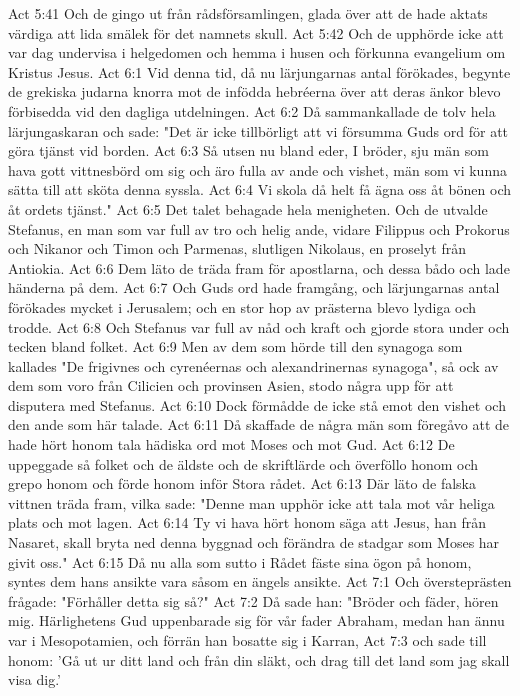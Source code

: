 Act 5:41  Och de gingo ut från rådsförsamlingen, glada över att de hade aktats värdiga att lida smälek för det namnets skull.
Act 5:42  Och de upphörde icke att var dag undervisa i helgedomen och hemma i husen och förkunna evangelium om Kristus Jesus.
Act 6:1  Vid denna tid, då nu lärjungarnas antal förökades, begynte de grekiska judarna knorra mot de infödda hebréerna över att deras änkor blevo förbisedda vid den dagliga utdelningen.
Act 6:2  Då sammankallade de tolv hela lärjungaskaran och sade: "Det är icke tillbörligt att vi försumma Guds ord för att göra tjänst vid borden.
Act 6:3  Så utsen nu bland eder, I bröder, sju män som hava gott vittnesbörd om sig och äro fulla av ande och vishet, män som vi kunna sätta till att sköta denna syssla.
Act 6:4  Vi skola då helt få ägna oss åt bönen och åt ordets tjänst."
Act 6:5  Det talet behagade hela menigheten. Och de utvalde Stefanus, en man som var full av tro och helig ande, vidare Filippus och Prokorus och Nikanor och Timon och Parmenas, slutligen Nikolaus, en proselyt från Antiokia.
Act 6:6  Dem läto de träda fram för apostlarna, och dessa bådo och lade händerna på dem.
Act 6:7  Och Guds ord hade framgång, och lärjungarnas antal förökades mycket i Jerusalem; och en stor hop av prästerna blevo lydiga och trodde.
Act 6:8  Och Stefanus var full av nåd och kraft och gjorde stora under och tecken bland folket.
Act 6:9  Men av dem som hörde till den synagoga som kallades "De frigivnes och cyrenéernas och alexandrinernas synagoga", så ock av dem som voro från Cilicien och provinsen Asien, stodo några upp för att disputera med Stefanus.
Act 6:10  Dock förmådde de icke stå emot den vishet och den ande som här talade.
Act 6:11  Då skaffade de några män som föregåvo att de hade hört honom tala hädiska ord mot Moses och mot Gud.
Act 6:12  De uppeggade så folket och de äldste och de skriftlärde och överföllo honom och grepo honom och förde honom inför Stora rådet.
Act 6:13  Där läto de falska vittnen träda fram, vilka sade: "Denne man upphör icke att tala mot vår heliga plats och mot lagen.
Act 6:14  Ty vi hava hört honom säga att Jesus, han från Nasaret, skall bryta ned denna byggnad och förändra de stadgar som Moses har givit oss."
Act 6:15  Då nu alla som sutto i Rådet fäste sina ögon på honom, syntes dem hans ansikte vara såsom en ängels ansikte.
Act 7:1  Och översteprästen frågade: "Förhåller detta sig så?"
Act 7:2  Då sade han: "Bröder och fäder, hören mig. Härlighetens Gud uppenbarade sig för vår fader Abraham, medan han ännu var i Mesopotamien, och förrän han bosatte sig i Karran,
Act 7:3  och sade till honom: 'Gå ut ur ditt land och från din släkt, och drag till det land som jag skall visa dig.'
